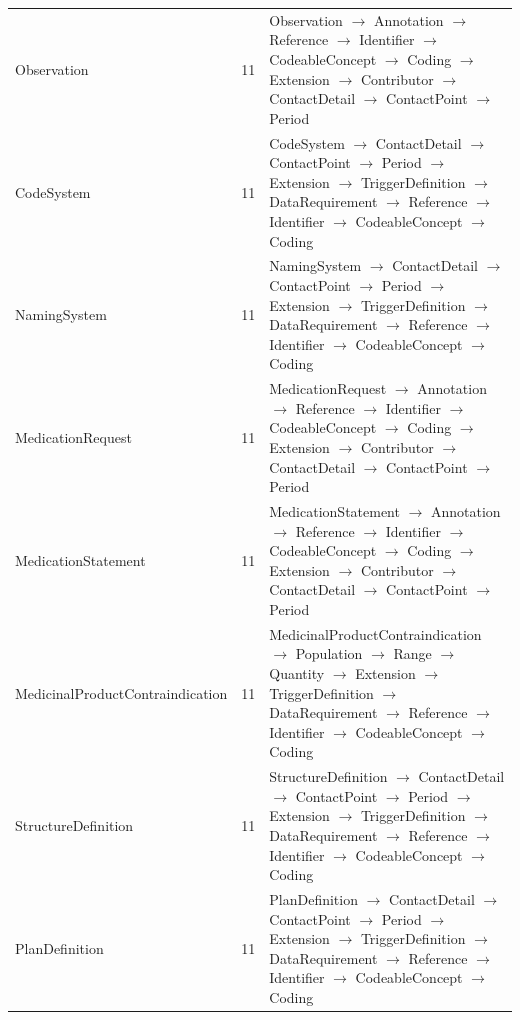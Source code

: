 \begin{longtable}{lrl}
Observation & 11 & Observation $\rightarrow$ Annotation $\rightarrow$ Reference $\rightarrow$ Identifier $\rightarrow$ CodeableConcept $\rightarrow$ Coding $\rightarrow$ Extension $\rightarrow$ Contributor $\rightarrow$ ContactDetail $\rightarrow$ ContactPoint $\rightarrow$ Period \\
CodeSystem & 11 & CodeSystem $\rightarrow$ ContactDetail $\rightarrow$ ContactPoint $\rightarrow$ Period $\rightarrow$ Extension $\rightarrow$ TriggerDefinition $\rightarrow$ DataRequirement $\rightarrow$ Reference $\rightarrow$ Identifier $\rightarrow$ CodeableConcept $\rightarrow$ Coding \\
NamingSystem & 11 & NamingSystem $\rightarrow$ ContactDetail $\rightarrow$ ContactPoint $\rightarrow$ Period $\rightarrow$ Extension $\rightarrow$ TriggerDefinition $\rightarrow$ DataRequirement $\rightarrow$ Reference $\rightarrow$ Identifier $\rightarrow$ CodeableConcept $\rightarrow$ Coding \\
MedicationRequest & 11 & MedicationRequest $\rightarrow$ Annotation $\rightarrow$ Reference $\rightarrow$ Identifier $\rightarrow$ CodeableConcept $\rightarrow$ Coding $\rightarrow$ Extension $\rightarrow$ Contributor $\rightarrow$ ContactDetail $\rightarrow$ ContactPoint $\rightarrow$ Period \\
MedicationStatement & 11 & MedicationStatement $\rightarrow$ Annotation $\rightarrow$ Reference $\rightarrow$ Identifier $\rightarrow$ CodeableConcept $\rightarrow$ Coding $\rightarrow$ Extension $\rightarrow$ Contributor $\rightarrow$ ContactDetail $\rightarrow$ ContactPoint $\rightarrow$ Period \\
MedicinalProductContraindication & 11 & MedicinalProductContraindication $\rightarrow$ Population $\rightarrow$ Range $\rightarrow$ Quantity $\rightarrow$ Extension $\rightarrow$ TriggerDefinition $\rightarrow$ DataRequirement $\rightarrow$ Reference $\rightarrow$ Identifier $\rightarrow$ CodeableConcept $\rightarrow$ Coding \\
StructureDefinition & 11 & StructureDefinition $\rightarrow$ ContactDetail $\rightarrow$ ContactPoint $\rightarrow$ Period $\rightarrow$ Extension $\rightarrow$ TriggerDefinition $\rightarrow$ DataRequirement $\rightarrow$ Reference $\rightarrow$ Identifier $\rightarrow$ CodeableConcept $\rightarrow$ Coding \\
PlanDefinition & 11 & PlanDefinition $\rightarrow$ ContactDetail $\rightarrow$ ContactPoint $\rightarrow$ Period $\rightarrow$ Extension $\rightarrow$ TriggerDefinition $\rightarrow$ DataRequirement $\rightarrow$ Reference $\rightarrow$ Identifier $\rightarrow$ CodeableConcept $\rightarrow$ Coding \\

\end{longtable}
